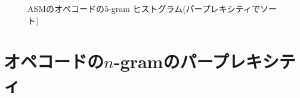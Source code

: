 \documentclass[12pt,twoside]{jreport}
\begin{document}
\begin{figure}[b]
{    \label{fig:asm-5gram-yguard-histogram}
  }%
  \caption{ASMのオペコードの$5$-gram ヒストグラム(パープレキシティでソート)}\label{fig:asm-5gram-histogram}
\end{figure}


\section{オペコードの$n$-gramのパープレキシティ}
\end{document}
